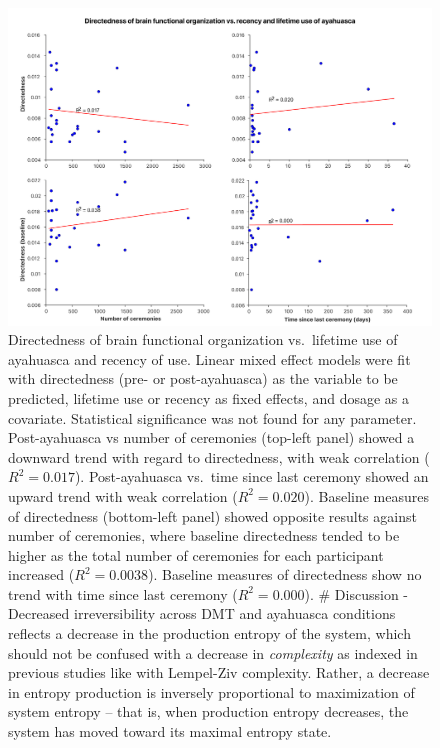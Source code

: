\begin{figure}[h!]
    \centering
    \includegraphics[width=\textwidth]{images/Figure 6_ Correlations between recency.png}
    \caption[Directedness of brain functional organization vs. lifetime use and recency of use.]{Directedness of brain functional organization vs.~lifetime use of
ayahuasca and recency of use. Linear mixed effect models were fit with
directedness (pre- or post-ayahuasca) as the variable to be predicted,
lifetime use or recency as fixed effects, and dosage as a covariate.
Statistical significance was not found for any parameter. Post-ayahuasca
vs number of ceremonies (top-left panel) showed a downward trend with
regard to directedness, with weak correlation (\(R^2=0.017\)).
Post-ayahuasca vs.~time since last ceremony showed an upward trend with
weak correlation (\(R^2=0.020\)). Baseline measures of directedness
(bottom-left panel) showed opposite results against number of
ceremonies, where baseline directedness tended to be higher as the total
number of ceremonies for each participant increased (\(R^2=0.0038\)).
Baseline measures of directedness show no trend with time since last
ceremony (\(R^2=0.000\)). \# Discussion - Decreased irreversibility
across DMT and ayahuasca conditions reflects a decrease in the
production entropy of the system, which should not be confused with a
decrease in \emph{complexity} as indexed in previous studies like with
Lempel-Ziv complexity. Rather, a decrease in entropy production is
inversely proportional to maximization of system entropy -- that is,
when production entropy decreases, the system has moved toward its
maximal entropy state.}
    \label{fig:corr}
\end{figure}

